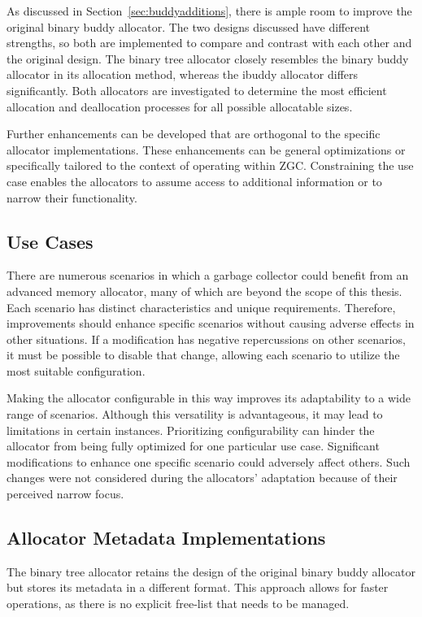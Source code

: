 As discussed in Section~\ref{sec:buddyadditions}, there is ample room to improve the original binary buddy allocator. The two designs discussed have different strengths, so both are implemented to compare and contrast with each other and the original design. The binary tree allocator closely resembles the binary buddy allocator in its allocation method, whereas the ibuddy allocator differs significantly. Both allocators are investigated to determine the most efficient allocation and deallocation processes for all possible allocatable sizes.

Further enhancements can be developed that are orthogonal to the specific allocator implementations. These enhancements can be general optimizations or specifically tailored to the context of operating within ZGC. Constraining the use case enables the allocators to assume access to additional information or to narrow their functionality.

\subsection{Use Cases}
There are numerous scenarios in which a garbage collector could benefit from an advanced memory allocator, many of which are beyond the scope of this thesis. Each scenario has distinct characteristics and unique requirements. Therefore, improvements should enhance specific scenarios without causing adverse effects in other situations. If a modification has negative repercussions on other scenarios, it must be possible to disable that change, allowing each scenario to utilize the most suitable configuration.

\newpage
Making the allocator configurable in this way improves its adaptability to a wide range of scenarios. Although this versatility is advantageous, it may lead to limitations in certain instances. Prioritizing configurability can hinder the allocator from being fully optimized for one particular use case. Significant modifications to enhance one specific scenario could adversely affect others. Such changes were not considered during the allocators' adaptation because of their perceived narrow focus.

\subsection{Allocator Metadata Implementations} \label{sec:adaptationsmetadata}
The binary tree allocator retains the design of the original binary buddy allocator but stores its metadata in a different format. This approach allows for faster operations, as there is no explicit free-list that needs to be managed.

